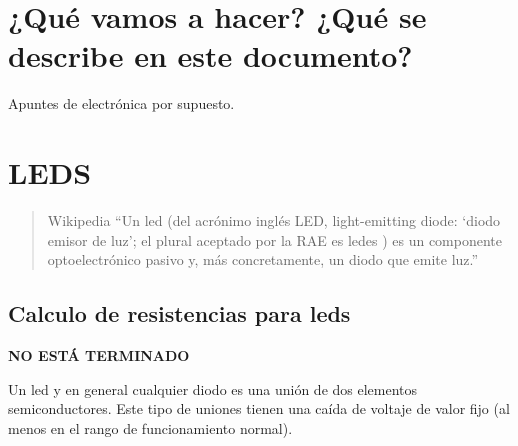 \section{¿Qué vamos a hacer? ¿Qué se describe en este
documento?}\label{quuxe9-vamos-a-hacer-quuxe9-se-describe-en-este-documento}

Apuntes de electrónica por supuesto.

\section{LEDS}\label{leds}

\begin{quote}
Wikipedia ``Un led (del acrónimo inglés LED, light-emitting diode:
`diodo emisor de luz'; el plural aceptado por la RAE es ledes ) es un
componente optoelectrónico pasivo y, más concretamente, un diodo que
emite luz.''
\end{quote}

\subsection{Calculo de resistencias para
leds}\label{calculo-de-resistencias-para-leds}

\textbf{NO ESTÁ TERMINADO}

Un led y en general cualquier diodo es una unión de dos elementos
semiconductores. Este tipo de uniones tienen una caída de voltaje de
valor fijo (al menos en el rango de funcionamiento normal).

